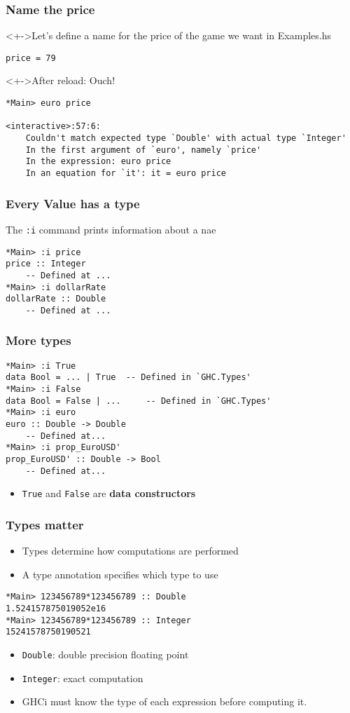 \documentclass{beamer}
\begin{document}
\begin{frame}[fragile]
  \frametitle{Name the price}
  \begin{block}<+->{Let's define a name for the price of the game we want
      in Examples.hs}
\begin{verbatim}
price = 79
\end{verbatim}
  \end{block}
  \begin{alertblock}<+->{After reload: Ouch!}
\begin{verbatim}
*Main> euro price

<interactive>:57:6:
    Couldn't match expected type `Double' with actual type `Integer'
    In the first argument of `euro', namely `price'
    In the expression: euro price
    In an equation for `it': it = euro price
\end{verbatim}
  \end{alertblock}
\end{frame}
\begin{frame}[fragile]
  \frametitle{Every Value has a type}
  The \texttt{:i} command prints information about a nae
\begin{verbatim}
*Main> :i price
price :: Integer
  	-- Defined at ...
*Main> :i dollarRate
dollarRate :: Double
  	-- Defined at ...
\end{verbatim}
\end{frame}
\begin{frame}[fragile]
  \frametitle{More types}
\begin{verbatim}
*Main> :i True
data Bool = ... | True 	-- Defined in `GHC.Types'
*Main> :i False
data Bool = False | ... 	-- Defined in `GHC.Types'
*Main> :i euro
euro :: Double -> Double
  	-- Defined at...
*Main> :i prop_EuroUSD'
prop_EuroUSD' :: Double -> Bool
  	-- Defined at...
\end{verbatim}
  \begin{itemize}
  \item \texttt{True} and \texttt{False} are \textbf{data constructors}
  \end{itemize}
\end{frame}
\begin{frame}[fragile]
  \frametitle{Types matter}
  \begin{itemize}
  \item Types determine how computations are performed
  \item A type annotation specifies which type to use
  \end{itemize}
\begin{verbatim}
*Main> 123456789*123456789 :: Double
1.524157875019052e16
*Main> 123456789*123456789 :: Integer
15241578750190521
\end{verbatim}
  \begin{itemize}
  \item \texttt{Double}: double precision floating point 
  \item  \texttt{Integer}: exact computation
  \item  GHCi must know the type of each expression before computing it.
  \end{itemize}
\end{frame}
\end{document}
